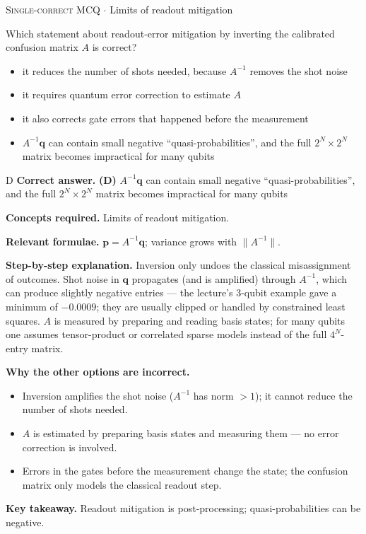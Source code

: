 \documentclass[11pt,a4paper]{article}
\newcommand{\optlabel}[1]{\textbf{(#1)}}
\newcommand{\correctlabel}[1]{\textcolor{okgreen}{\textbf{(#1)}\,\ding{51}}}
\newenvironment{qitem}[1]{\begin{list}{}{\setlength{\leftmargin}{3.3em}\setlength{\labelwidth}{3.1em}%
  \setlength{\labelsep}{0.2em}\setlength{\topsep}{3pt}\setlength{\parsep}{3pt}}\item[\textbf{Q.#1}\hfill]}{\end{list}}
\newcommand{\qsep}{\par\vspace{2pt}{\color{black!15}\hrule}\vspace{4pt}}
\newcommand{\qmeta}[2]{{\footnotesize\color{black!60}\textsc{#1} \;$\cdot$\; #2}\par}
\begin{document}
\begin{qitem}{67}
\qmeta{Single-correct MCQ}{Limits of readout mitigation}
Which statement about readout-error mitigation by inverting the calibrated confusion matrix $A$ is correct?
\begin{itemize}[leftmargin=2.6em, labelsep=0.4em, itemsep=2pt, topsep=3pt]
\item[\optlabel{A}] it reduces the number of shots needed, because $A^{-1}$ removes the shot noise
\item[\optlabel{B}] it requires quantum error correction to estimate $A$
\item[\optlabel{C}] it also corrects gate errors that happened before the measurement
\item[\correctlabel{D}] $A^{-1}\mathbf q$ can contain small negative ``quasi-probabilities'', and the full $2^N\times2^N$ matrix becomes impractical for many qubits
\end{itemize}
\end{qitem}
\begin{solbox}{D}
\textbf{\color{brand}Correct answer.} \textcolor{okgreen}{\textbf{(D)}} $A^{-1}\mathbf q$ can contain small negative ``quasi-probabilities'', and the full $2^N\times2^N$ matrix becomes impractical for many qubits

\textbf{\color{brand}Concepts required.} Limits of readout mitigation.

\textbf{\color{brand}Relevant formulae.} $\mathbf p = A^{-1}\mathbf q$; variance grows with $\|A^{-1}\|$.

\textbf{\color{brand}Step-by-step explanation.} Inversion only undoes the classical misassignment of outcomes. Shot noise in $\mathbf q$ propagates (and is amplified) through $A^{-1}$, which can produce slightly
negative entries --- the lecture's 3-qubit example gave a minimum of $-0.0009$; they are usually clipped or handled by constrained least squares. $A$ is measured
by preparing and reading basis states; for many qubits one assumes tensor-product or correlated sparse models instead of the full $4^N$-entry matrix.

\textbf{\color{brand}Why the other options are incorrect.}
\begin{itemize}[leftmargin=2.4em, itemsep=1pt, topsep=2pt]
\item[\textbf{(A)}] Inversion amplifies the shot noise ($A^{-1}$ has norm $> 1$); it cannot reduce the number of shots needed.
\item[\textbf{(B)}] $A$ is estimated by preparing basis states and measuring them --- no error correction is involved.
\item[\textbf{(C)}] Errors in the gates before the measurement change the state; the confusion matrix only models the classical readout step.
\end{itemize}
\textbf{\color{brand}Key takeaway.} Readout mitigation is post-processing; quasi-probabilities can be negative.
\end{solbox}
\qsep
\end{document}
